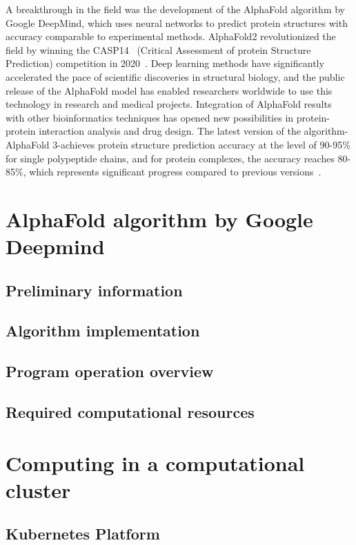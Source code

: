 A breakthrough in the field was the development of the AlphaFold algorithm by Google DeepMind, which uses neural networks to predict protein structures with accuracy comparable to experimental methods.
AlphaFold2 revolutionized the field by winning the CASP14~\cite{casp} (Critical Assessment of protein Structure Prediction) competition in 2020~\cite{alphafold2}.
Deep learning methods have significantly accelerated the pace of scientific discoveries in structural biology, and the public release of the AlphaFold model has enabled researchers worldwide to use this technology in research and medical projects.
Integration of AlphaFold results with other bioinformatics techniques has opened new possibilities in protein-protein interaction analysis and drug design.
The latest version of the algorithm-AlphaFold 3-achieves protein structure prediction accuracy at the level of 90-95\% for single polypeptide chains, and for protein complexes, the accuracy reaches 80-85\%, which represents significant progress compared to previous versions~\cite{alphafold3}.

\section{AlphaFold algorithm by Google Deepmind}

\subsection{Preliminary information}

\subsection{Algorithm implementation}

\subsection{Program operation overview}

\subsection{Required computational resources}


\section{Computing in a computational cluster}

\subsection{Kubernetes Platform}

